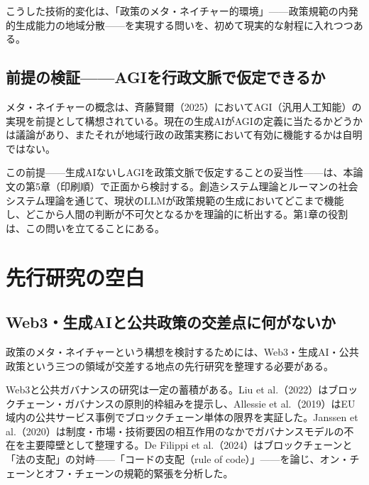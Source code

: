 こうした技術的変化は、「政策のメタ・ネイチャー的環境」——政策規範の内発的生成能力の地域分散——を実現する問いを、初めて現実的な射程に入れつつある。

\subsection{前提の検証——AGIを行政文脈で仮定できるか}
\label{subsec:intro_agi_premise}

メタ・ネイチャーの概念は、斉藤賢爾（2025）においてAGI（汎用人工知能）の実現を前提として構想されている\cite{saito2025metanature}。現在の生成AIがAGIの定義に当たるかどうかは議論があり、またそれが地域行政の政策実務において有効に機能するかは自明ではない。

この前提——生成AIないしAGIを政策文脈で仮定することの妥当性——は、本論文の第5章（印刷順）で正面から検討する。創造システム理論とルーマンの社会システム理論を通じて、現状のLLMが政策規範の生成においてどこまで機能し、どこから人間の判断が不可欠となるかを理論的に析出する。第1章の役割は、この問いを立てることにある。

\section{先行研究の空白}
\label{sec:intro_gap}

\subsection{Web3・生成AIと公共政策の交差点に何がないか}
\label{subsec:intro_gap_web3ai}

政策のメタ・ネイチャーという構想を検討するためには、Web3・生成AI・公共政策という三つの領域が交差する地点の先行研究を整理する必要がある。

Web3と公共ガバナンスの研究は一定の蓄積がある。Liu et al.（2022）はブロックチェーン・ガバナンスの原則的枠組みを提示し\cite{liu2022blockchain_governance}、Allessie et al.（2019）はEU域内の公共サービス事例でブロックチェーン単体の限界を実証した\cite{allessie2019blockchain}。Janssen et al.（2020）は制度・市場・技術要因の相互作用のなかでガバナンスモデルの不在を主要障壁として整理する\cite{janssen2020blockchain}。De Filippi et al.（2024）はブロックチェーンと「法の支配」の対峙——「コードの支配（rule of code）」——を論じ、オン・チェーンとオフ・チェーンの規範的緊張を分析した\cite{defilippi2024ruleofcode}。

